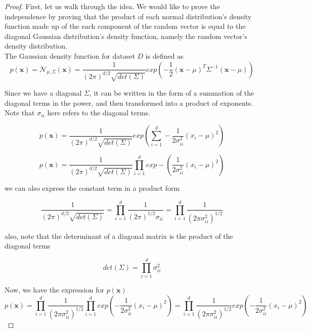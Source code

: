 \documentclass[12pt]{article}
\begin{document}
\begin{proof}
First, let us walk through the idea. We would like to prove the independence by proving that the product of each normal distribution's density function made up of the each component of the random vector is equal to the diagonal Gaussian distribution's density function, namely the random vector's density distribution. \\
The Gaussian density function for dataset $D$ is defined as \\

\begin{equation*}
p(\bm{x}) = \mathcal{N}_{\mu, \Sigma}(\bm{x}) = \frac{1}{(2\pi)^{d/2}\sqrt{det(\Sigma)}} exp(-\frac{1}{2}(\bm{x} - \mu)^T \Sigma^{-1} (\bm{x} - \mu)) 
\end{equation*}

Since we have a diagonal $\Sigma$, it can be written in the form of a summation of the diagonal terms in the power, and then transformed into a product of exponents. Note that $\sigma_{ii}$ here refers to the diagonal terms.

\begin{equation*}
p(\bm{x}) = \frac{1}{(2\pi)^{d/2}\sqrt{det(\Sigma)}} exp(\sum_{i=1}^{d} -\frac{1}{2 \sigma_{ii}^2}(x_i - \mu)^2) 
\end{equation*}

\begin{equation*}
p(\bm{x}) = \frac{1}{(2\pi)^{d/2}\sqrt{det(\Sigma)}} \prod_{i=1}^{d} exp -(\frac{1}{2 \sigma_{ii}^2}(x_i - \mu)^2)
\end{equation*}

we can also express the constant term in a product form

\begin{equation*}
\frac{1}{(2\pi)^{d/2}\sqrt{det(\Sigma)}}  = \prod_{i=1}^{d} \frac{1}{(2\pi)^{1/2} \sigma_{ii} } =  \prod_{i=1}^{d} \frac{1}{(2\pi \sigma_{ii}^2)^{1/2} }
\end{equation*}

also, note that the determinant of a diagonal matrix is the product of the diagonal terms

\begin{equation*}
det(\Sigma) = \prod_{i=1}^{d} \sigma_{ii}^2
\end{equation*}

Now, we have the expression for $p(\bm{x})$
\begin{equation*}
p(\bm{x}) = \prod_{i=1}^{d} \frac{1}{(2\pi \sigma_{ii}^2)^{1/2} } \prod_{i=1}^{d} exp (-\frac{1}{2 \sigma_{ii}^2}(x_i - \mu)^2) = \prod_{i=1}^{d} \frac{1}{(2\pi \sigma_{ii}^2)^{1/2} } exp (-\frac{1}{2 \sigma_{ii}^2}(x_i - \mu)^2) 
\end{equation*}


\end{proof}
\end{document}
